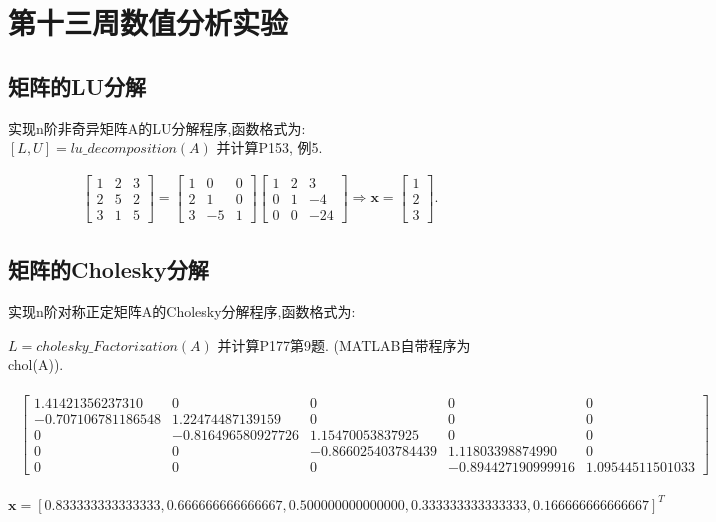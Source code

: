 \section{第十三周数值分析实验}
\subsection{矩阵的LU分解}
\begin{ex}
	实现n阶非奇异矩阵A的LU分解程序,函数格式为:
	$[L,U]=lu\_decomposition(A)$
	并计算P153, 例5.
\end{ex}


\qa 
\begin{eqnarray*}
	\begin{bmatrix}
		1 & 2 & 3\\
		2 & 5 & 2\\
		3 & 1 & 5
	\end{bmatrix}
	=\begin{bmatrix}
		1&0&0\\
		2&1&0\\
		3&-5&1
	\end{bmatrix}
	\begin{bmatrix}
		1&2&3\\
		0&1&-4\\
		0&0&-24
	\end{bmatrix}
	\Longrightarrow
	\boldsymbol{x}=
	\begin{bmatrix}
		1\\2\\3
	\end{bmatrix}.
\end{eqnarray*}

\subsection{矩阵的Cholesky分解}
\begin{ex}
	实现n阶对称正定矩阵A的Cholesky分解程序,函数格式为:
	
	$L=cholesky\_Factorization (A)$
	并计算P177第9题. (MATLAB自带程序为chol(A)).
\end{ex}


\qa 
\begin{scriptsize}
	\begin{align*}
		\begin{array}{lc}
			\begin{bmatrix}
				1.41421356237310&0&0&0&0\\
				-0.707106781186548&1.22474487139159&0&0&0\\
				0&-0.816496580927726&1.15470053837925&0&0\\
				0&0&-0.866025403784439&1.11803398874990&0\\
				0&0&0&-0.894427190999916&1.09544511501033
			\end{bmatrix}
		\end{array}
	\end{align*}

$\boldsymbol{x}=\left[0.833333333333333,0.666666666666667,0.500000000000000,0.333333333333333,0.166666666666667\right]^T$
\end{scriptsize}